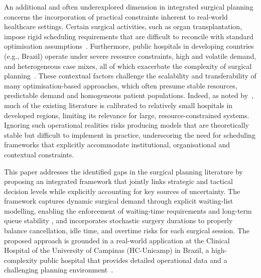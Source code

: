 An additional and often underexplored dimension in integrated surgical planning concerns the incorporation of practical constraints inherent to real-world healthcare settings. 
Certain surgical activities, such as organ transplantation, impose rigid scheduling requirements that are difficult to reconcile with standard optimisation assumptions~\citep{Silva2025}. 
Furthermore, public hospitals in developing countries (e.g., Brazil) operate under severe resource constraints, high and volatile demand, and heterogeneous case mixes, all of which exacerbate the complexity of surgical planning~\citep{Carneiro2025, Siqueira2018INTO, Silva2025}. 
These contextual factors challenge the scalability and transferability of many optimisation-based approaches, which often presume stable resources, predictable demand and homogeneous patient populations. 
Indeed, as noted by~\citet{Melo2025}, much of the existing literature is calibrated to relatively small hospitals in developed regions, limiting its relevance for large, resource-constrained systems. 
Ignoring such operational realities risks producing models that are theoretically stable but difficult to implement in practice, underscoring the need for scheduling frameworks that explicitly accommodate institutional, organisational and contextual constraints.

This paper addresses the identified gaps in the surgical planning literature by proposing an integrated framework that jointly links strategic and tactical decision levels while explicitly accounting for key sources of uncertainty. 
The framework captures dynamic surgical demand through explicit waiting-list modelling, enabling the enforcement of waiting-time requirements and long-term queue stability \citep{Shortle2018}, and incorporates stochastic surgery durations to properly balance cancellation, idle time, and overtime risks for each surgical session. The proposed approach is grounded in a real-world application at the Clinical Hospital of the University of Campinas (HC-Unicamp) in Brazil, a high-complexity public hospital that provides detailed operational data and a challenging planning environment~\citep{hc_unicamp_historia}.

